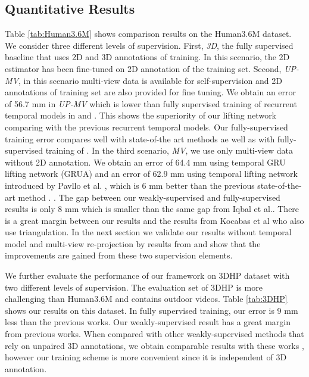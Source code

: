 \documentclass[10pt,twocolumn,letterpaper]{article}
\begin{document}
\subsection{Quantitative Results}
Table \ref{tab:Human3.6M} shows comparison results on the Human3.6M dataset. We consider three different levels of supervision. 
First, \textit{3D}, the fully supervised baseline that uses 2D and 3D annotations of training. In this scenario, the 2D estimator has been fine-tuned on 2D annotation of the training set. 
Second, \textit{UP-MV}, in this scenario multi-view data is available for self-supervision and 2D annotations of training set are also provided for fine tuning. We obtain an error of 56.7 mm in \textit{UP-MV} which is lower than fully supervised training of recurrent temporal models in \cite{Hossain_2018_ECCV} and \cite{Kocabas_2020_CVPR}. This shows the superiority of our lifting network comparing with the previous recurrent temporal models. Our fully-supervised training error compares well with state-of-the art methods ae well as with fully-supervised training of \cite{Iqbal_2020_CVPR}. 
In the third scenario, \textit{MV}, we use only multi-view data without 2D annotation. We obtain an error of 64.4 mm using temporal GRU lifting network (GRUA) and an error of 62.9 mm using  temporal lifting network introduced by Pavllo et al. \cite{Pavllo_2019_CVPR}, which is 6 mm  better than the previous state-of-the-art method \cite{Iqbal_2020_CVPR}.  \cite{wandt2020canonpose}. The gap between our weakly-supervised and fully-supervised results is only 8 mm which is smaller than the same gap from Iqbal et al.\cite{Iqbal_2020_CVPR}. There is a great margin between our results and the results from Kocabas et al \cite{Kocabas_2019_CVPR} who also use triangulation. In the next section we validate our results without temporal model and multi-view re-projection by results from \cite{Kocabas_2019_CVPR} and show that the improvements are gained from these two supervision elements.

We further evaluate the performance of our framework on 3DHP dataset with two different levels of supervision. The evaluation set of 3DHP is more challenging than Human3.6M and contains outdoor videos. Table \ref{tab:3DHP} shows our results on this dataset. In fully supervised training, our error is 9 mm less than the previous works. Our weakly-supervised result has a great margin from previous works. When compared with other weakly-supervised methods that rely on unpaired 3D annotations, we obtain comparable results with these works \cite{Kundu_2020_CVPR}, however our training scheme is more convenient since it is independent of 3D annotation. 
\end{document}
